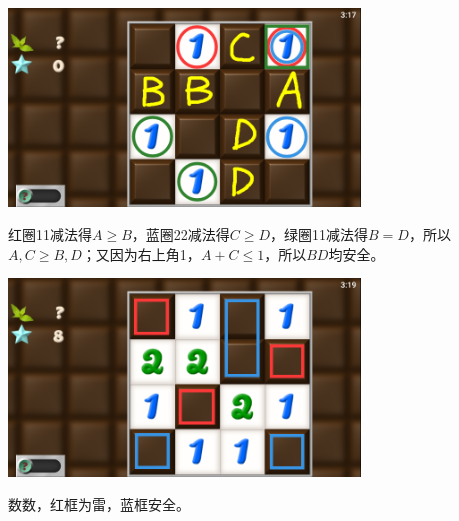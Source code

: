\subsection{} %
\begin{center}
    \includegraphics[width=0.7\textwidth]{puzzle/155-1.png}
\end{center}
红圈11减法得$A\ge B$，蓝圈22减法得$C\ge D$，绿圈11减法得$B=D$，所以$A,C\ge B,D$；又因为右上角1，$A+C\le 1$，所以$BD$均安全。
\begin{center}
    \includegraphics[width=0.7\textwidth]{puzzle/155-2.png}
\end{center}
数数，红框为雷，蓝框安全。

